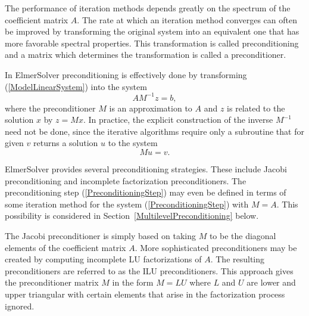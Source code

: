 The performance of iteration methods depends greatly on the spectrum
of the coefficient matrix $A$. The rate at which an iteration method converges
can often be improved by transforming the original system into an equivalent one 
that has more favorable spectral properties. This transformation is called
preconditioning and a matrix which determines the transformation is called 
a preconditioner.  

In ElmerSolver preconditioning is effectively done by transforming (\ref{ModelLinearSystem}) 
into the system
\begin{equation}
AM^{-1} z = b,
\end{equation}
where the preconditioner $M$ is an approximation to $A$ and $z$ is related
to the solution $x$ by $z=Mx$. In practice, the explicit construction of the 
inverse $M^{-1}$ need not be done, since the iterative algorithms require only a subroutine
that for given $v$ returns a solution $u$ to the system  
\begin{equation}\label{PreconditioningStep}
  M u = v.
\end{equation}

ElmerSolver provides several preconditioning strategies.
These include Jacobi preconditioning and
incomplete factorization preconditioners. The preconditioning step
(\ref{PreconditioningStep}) may even be defined in terms of   
some iteration method for the system (\ref{PreconditioningStep}) with
$M=A$. This possibility is considered in Section~\ref{MultilevelPreconditioning} below. 


The Jacobi preconditioner is simply based on taking $M$ to be the diagonal elements of 
the coefficient matrix $A$. More sophisticated preconditioners may be created by
computing incomplete LU factorizations of $A$. The resulting preconditioners are referred 
to as the ILU preconditioners. This approach gives the 
preconditioner matrix $M$ in the form $M=LU$ where $L$ and $U$ are lower and upper 
triangular with certain elements that arise in the factorization process ignored. 

